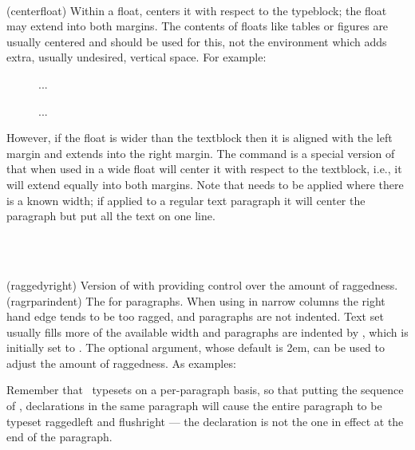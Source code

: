 \begin{syntax}
\cmd{\centerfloat} \\
\end{syntax}
\glossary(centerfloat)%
  {}%
  {Within a float, centers it with respect to the typeblock; the float 
   may extend into both margins.}
The contents of floats like tables or figures are usually centered 
and \cmd{\centering}
should be used for this, not the  environment which adds extra,
usually undesired, vertical space. For example:
\begin{lcode}
\begin{figure}
\centering
...
\caption{...}
\end{figure}
\end{lcode} 
However, if the float is wider than the
textblock then it is aligned with the left margin and extends into the right
margin. The command \cmd{\centerfloat} is a special version of \cmd{\center}
that when used in a wide float will center it with respect to the textblock,
i.e., it will extend equally into both margins. Note that \cmd{\centerfloat}
needs to be applied where there is a known width; if applied to a regular
text paragraph it will center the paragraph but put all the text on one line.

\begin{syntax}
\cmd{\raggedyright} \\
\lnc{\ragrparindent} \\
\end{syntax}
\glossary(raggedyright)%
  {}%
  {Version of  with  providing control
   over the amount of raggedness.}
\glossary(ragrparindent)%
  {}%
  {The  for  paragraphs.}
When using \cmd{\raggedright} in narrow columns the right hand edge tends to
be too ragged, and paragraphs are not indented. 
Text set \cmd{\raggedyright} usually fills more of the available
width and paragraphs are indented by \lnc{\ragrparindent}, which is initially
set to \lnc{\parindent}. The optional  argument, whose default
is 2em, can be used to adjust the amount of raggedness. As examples:
\begin{lcode}
\raggedyright[0pt]   %
\raggedyright[1fil]  %
\raggedyright[0.5em] %
\end{lcode}

    Remember that \ltx\ typesets on a per-paragraph
 basis, so that putting
the sequence of \cmd{\centering}, \cmd{\raggedleft} declarations in the same
paragraph will cause the entire paragraph to be typeset 
raggedleft and 
flushright --- the \cmd{\centering} declaration is not the one in effect 
at the end of the paragraph.

